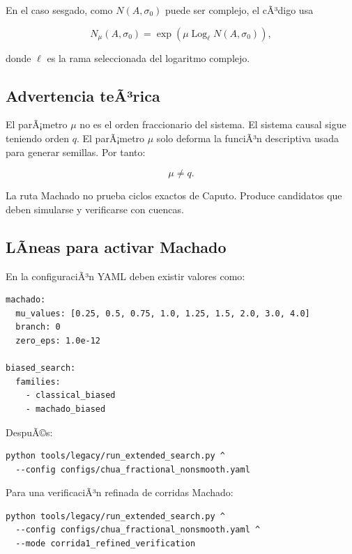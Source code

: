 \documentclass[11pt]{article}
\begin{document}
En el caso sesgado, como \(N(A,\sigma_0)\) puede ser complejo, el cÃ³digo usa

\begin{equation}
N_{\mu}(A,\sigma_0)
=
\exp\left(\mu\operatorname{Log}_{\ell}N(A,\sigma_0)\right),
\end{equation}

donde \(\ell\) es la rama seleccionada del logaritmo complejo.

\subsection{Advertencia teÃ³rica}

El parÃ¡metro \(\mu\) no es el orden fraccionario del sistema. El sistema causal sigue teniendo orden \(q\). El parÃ¡metro \(\mu\) solo deforma la funciÃ³n descriptiva usada para generar semillas. Por tanto:

\begin{equation}
\mu\neq q.
\end{equation}

La ruta Machado no prueba ciclos exactos de Caputo. Produce candidatos que deben simularse y verificarse con cuencas.

\subsection{LÃ­neas para activar Machado}

En la configuraciÃ³n YAML deben existir valores como:

\begin{lstlisting}
machado:
  mu_values: [0.25, 0.5, 0.75, 1.0, 1.25, 1.5, 2.0, 3.0, 4.0]
  branch: 0
  zero_eps: 1.0e-12

biased_search:
  families:
    - classical_biased
    - machado_biased
\end{lstlisting}

DespuÃ©s:

\begin{lstlisting}
python tools/legacy/run_extended_search.py ^
  --config configs/chua_fractional_nonsmooth.yaml
\end{lstlisting}

Para una verificaciÃ³n refinada de corridas Machado:

\begin{lstlisting}
python tools/legacy/run_extended_search.py ^
  --config configs/chua_fractional_nonsmooth.yaml ^
  --mode corrida1_refined_verification
\end{lstlisting}
\end{document}
